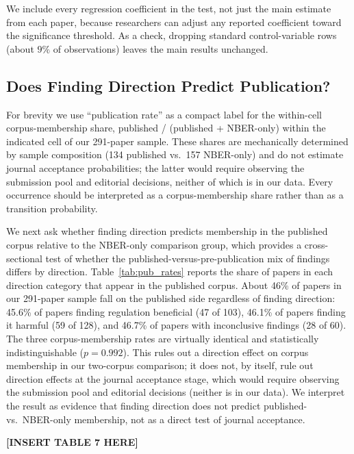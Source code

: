 \documentclass[12pt]{article}
\begin{document}
We include every regression coefficient in the test, not just the
main estimate from each paper, because researchers can adjust any
reported coefficient toward the significance threshold.  As a check,
dropping standard control-variable rows (about $9\%$ of observations)
leaves the main results unchanged.

\subsection{Does Finding Direction Predict Publication?}
\label{subsec:direction_results}

For brevity we use ``publication
rate'' as a compact label for the within-cell corpus-membership share, published / (published + NBER-only) within the indicated cell
of our 291-paper sample.  These shares are mechanically determined by
sample composition (134 published vs.\ 157 NBER-only) and do not
estimate journal acceptance probabilities; the latter would require
observing the submission pool and editorial decisions, neither of
which is in our data.  Every occurrence should be interpreted as a
corpus-membership share rather than as a
transition probability.

We next ask whether finding direction predicts membership in the published
corpus relative to the NBER-only comparison group, which provides a
cross-sectional test of whether the published-versus-pre-publication mix
of findings differs by direction.  Table~\ref{tab:pub_rates} reports the
share of papers in each direction category that appear in the published
corpus.  About 46\% of papers in our 291-paper sample fall on the
published side regardless of finding direction: 45.6\% of papers finding
regulation beneficial (47 of 103), 46.1\% of papers finding it harmful
(59 of 128), and 46.7\% of papers with inconclusive findings (28 of 60).
The three corpus-membership rates are virtually identical and
statistically indistinguishable ($p = 0.992$).  This rules out a
direction effect on corpus membership in our two-corpus
comparison; it does not, by itself, rule out direction effects at the
journal acceptance stage, which would require observing the submission
pool and editorial decisions (neither is in our data).  We interpret the
result as evidence that finding direction does not predict published-vs.\
NBER-only membership, not as a direct test of journal acceptance.


\begin{center}
\textbf{[INSERT TABLE 7 HERE]}
\end{center}
\end{document}
